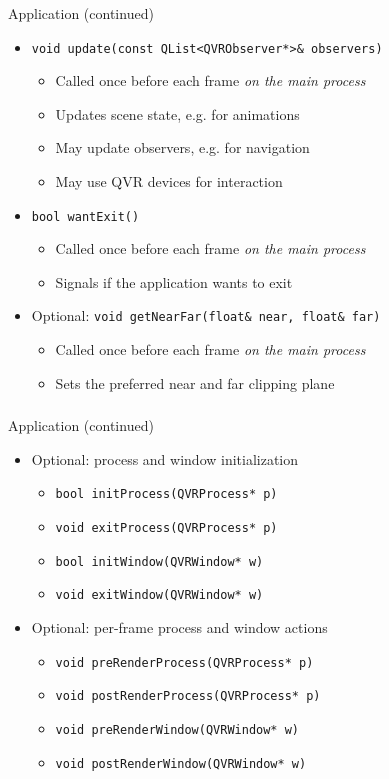 \documentclass[utf8,stillsansserifmath,fleqn,t]{beamer}
\newcommand{\code}[1]{\texttt{#1}}
\begin{document}
\begin{frame}
\frametitle{\insertsection}
Application (continued)
\begin{itemize}
\item \code{void update(const QList<QVRObserver*>\& observers)}
    \begin{itemize}
    \item Called once before each frame \emph{on the main process}
    \item Updates scene state, e.g. for animations
    \item May update observers, e.g. for navigation
    \item May use QVR devices for interaction
    \end{itemize}
\item \code{bool wantExit()}
    \begin{itemize}
    \item Called once before each frame \emph{on the main process}
    \item Signals if the application wants to exit
    \end{itemize}
\item Optional: \code{void getNearFar(float\& near, float\& far)}
    \begin{itemize}
    \item Called once before each frame \emph{on the main process}
    \item Sets the preferred near and far clipping plane
    \end{itemize}
\end{itemize}
\end{frame}

\begin{frame}
\frametitle{\insertsection}
Application (continued)
\begin{itemize}
\item Optional: process and window initialization
    \begin{itemize}
    \item \code{bool initProcess(QVRProcess* p)}
    \item \code{void exitProcess(QVRProcess* p)}
    \item \code{bool initWindow(QVRWindow* w)}
    \item \code{void exitWindow(QVRWindow* w)}
    \end{itemize}
\item Optional: per-frame process and window actions
    \begin{itemize}
    \item \code{void preRenderProcess(QVRProcess* p)}
    \item \code{void postRenderProcess(QVRProcess* p)}
    \item \code{void preRenderWindow(QVRWindow* w)}
    \item \code{void postRenderWindow(QVRWindow* w)}
    \end{itemize}
\end{itemize}
\end{frame}
\end{document}
